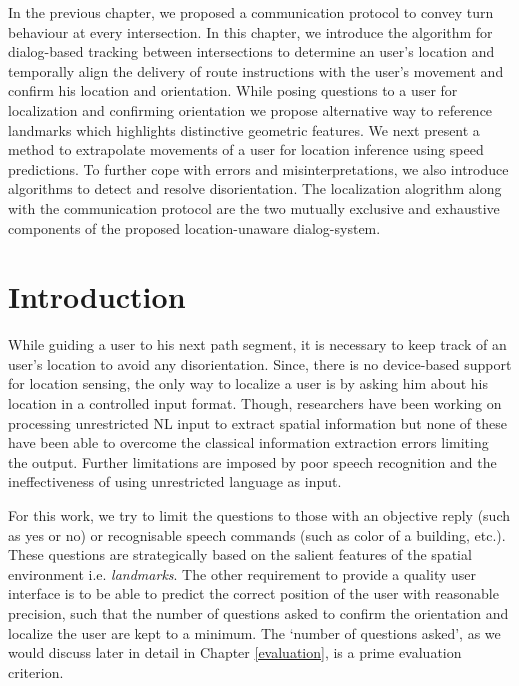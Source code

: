 \documentclass{iitkthesis}
\begin{document}
In the previous chapter, we proposed a communication protocol to convey 
turn behaviour at every intersection. In this chapter, we introduce the 
algorithm for dialog-based tracking between intersections to 
determine an user's location and temporally align the delivery of route 
instructions with the user's movement and confirm his location and 
orientation. While posing questions to a user for localization and 
confirming orientation we propose alternative way to reference 
landmarks which highlights distinctive geometric features. We next 
present a method to extrapolate movements of a user for location 
inference using speed predictions. To further cope with errors and 
misinterpretations, we also introduce algorithms to detect and 
resolve disorientation. The localization alogrithm along with the 
communication protocol are the two mutually exclusive and exhaustive 
components of the proposed location-unaware dialog-system. 

\section{Introduction} 
While guiding a user to his next path segment, it is necessary to keep track 
of an user's location to avoid any disorientation. Since, there is no 
device-based support for location sensing, the only way to localize a 
user is by asking him about his location in a controlled input format. 
Though, researchers 
\cite{tellex:language, Kordjamshidi:labelling, matuszek:following} have 
been working on processing unrestricted NL input to extract spatial 
information but none of these have been able to overcome the classical 
information extraction errors limiting the output. Further limitations 
are imposed by poor speech recognition and the ineffectiveness of using 
unrestricted language as input.
 
For this work, we try to limit the questions to those with an objective 
reply (such as yes or no) or recognisable speech commands (such as color 
of a building, etc.). These questions are strategically based on the 
salient features of the spatial environment i.e. \textit{landmarks}. The 
other requirement to provide a quality user interface is to be able to 
predict the correct position of the user with reasonable precision, such that the number of questions asked to confirm the orientation and 
localize the user are kept to a minimum. The `number of questions asked', as 
we would discuss later in detail in Chapter \ref{evaluation}, is a 
prime evaluation criterion.
\end{document}
